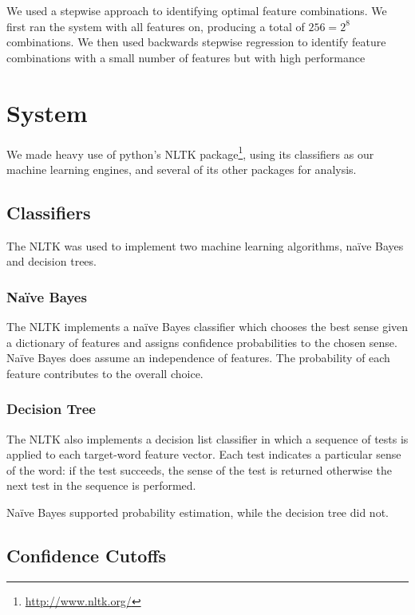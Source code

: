 \documentclass{article}
\newcommand{\naive}{na\"ive}
\newcommand{\Naive}{Na\"ive}
\begin{document}
We used a \ward stepwise approach to identifying optimal feature combinations.
We first ran the system with all features on, producing a total of $256=2^8$
combinations.  We then used backwards stepwise regression to identify feature
combinations with a small number of features but with high performance

\section{System}

We made heavy use of python's NLTK
package\footnote{\url{http://www.nltk.org/}}, using its classifiers as our
machine learning engines, and several of its other packages for analysis.

\subsection{Classifiers}

The NLTK was used to implement two machine learning algorithms, \naive{} Bayes and
decision trees.  

\subsubsection{\Naive{} Bayes}

The NLTK implements a \naive{} Bayes classifier which chooses the best sense given a
dictionary of features and assigns confidence probabilities to the chosen
sense. \Naive{} Bayes does assume an independence of features. The probability of
each feature contributes to the overall choice.

\subsubsection{Decision Tree}

The NLTK also implements a decision list classifier in which a sequence of
tests is applied to each target-word feature vector. Each test indicates a
particular sense of the word: if the test succeeds, the sense of the test is
returned otherwise the next test in the sequence is performed.

\Naive{} Bayes supported probability estimation, while the decision tree did not.

\subsection{Confidence Cutoffs}
\end{document}
